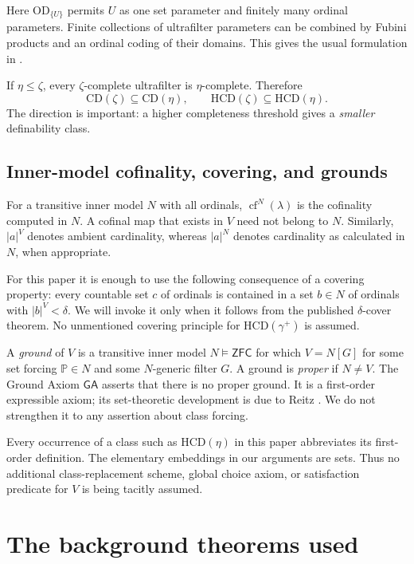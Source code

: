 \documentclass[11pt,letterpaper]{article}
\theoremstyle{definition}
\newcommand{\ZFC}{\mathsf{ZFC}}
\newcommand{\OD}{\mathrm{OD}}
\newcommand{\cf}{\operatorname{cf}}
\newcommand{\CD}{\mathrm{CD}}
\newcommand{\HCD}{\mathrm{HCD}}
\newcommand{\GA}{\mathsf{GA}}
\begin{document}
Here $\OD_{\{U\}}$ permits $U$ as one set parameter and finitely many ordinal parameters. Finite collections of ultrafilter parameters can be combined by Fubini products and an ordinal coding of their domains. This gives the usual formulation in \cite[Propositions 4.2 and 4.3]{uniqueness}.

If $\eta\le\zeta$, every $\zeta$-complete ultrafilter is $\eta$-complete. Therefore
\begin{equation}\label{eq:monotonicity}
\CD(\zeta)\subseteq\CD(\eta),\qquad
\HCD(\zeta)\subseteq\HCD(\eta).
\end{equation}
The direction is important: a higher completeness threshold gives a \emph{smaller} definability class.

\subsection{Inner-model cofinality, covering, and grounds}

For a transitive inner model $N$ with all ordinals, $\cf^N(\lambda)$ is the cofinality computed in $N$. A cofinal map that exists in $V$ need not belong to $N$. Similarly, $|a|^V$ denotes ambient cardinality, whereas $|a|^N$ denotes cardinality as calculated in $N$, when appropriate.

For this paper it is enough to use the following consequence of a covering property: every countable set $c$ of ordinals is contained in a set $b\in N$ of ordinals with $|b|^V<\delta$. We will invoke it only when it follows from the published $\delta$-cover theorem. No unmentioned covering principle for $\HCD(\gamma^+)$ is assumed.

A \emph{ground} of $V$ is a transitive inner model $N\models\ZFC$ for which $V=N[G]$ for some set forcing $\mathbb P\in N$ and some $N$-generic filter $G$. A ground is \emph{proper} if $N\ne V$. The Ground Axiom $\GA$ asserts that there is no proper ground. It is a first-order expressible axiom; its set-theoretic development is due to Reitz \cite{reitz}. We do not strengthen it to any assertion about class forcing.

Every occurrence of a class such as $\HCD(\eta)$ in this paper abbreviates its first-order definition. The elementary embeddings in our arguments are sets. Thus no additional class-replacement scheme, global choice axiom, or satisfaction predicate for $V$ is being tacitly assumed.

\section{The background theorems used}\label{sec:background}
\end{document}
